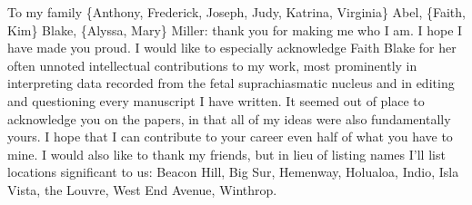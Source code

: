 {To my family
\{Anthony, Frederick, Joseph, Judy, Katrina, Virginia\} Abel, \{Faith, Kim\} Blake, \{Alyssa, Mary\} Miller:
thank you for making me who I am. I hope I have made you proud.
I would like to especially acknowledge Faith Blake for her often unnoted intellectual contributions to my work, most prominently in interpreting data recorded from the fetal suprachiasmatic nucleus and in editing and questioning every manuscript I have written.
It seemed out of place to acknowledge you on the papers, in that all of my ideas were also fundamentally yours.
I hope that I can contribute to your career even half of what you have to mine.
I would also like to thank my friends, but in lieu of listing names I'll list locations significant to us: Beacon Hill, Big Sur, Hemenway, Holualoa, Indio, Isla Vista, the Louvre, West End Avenue, Winthrop.
}

